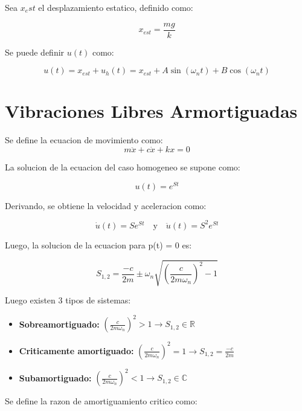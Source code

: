 \documentclass{article}  %
\begin{document}
Sea $x_est$ el desplazamiento estatico, definido como:

\begin{equation}
    x_{est} = \frac{mg}{k}
\end{equation}

Se puede definir $u(t)$ como:

\begin{equation}
    u(t) = x_{est} + u_h(t) = x_{est} + A \sin(\omega_n t) + B \cos(\omega_n t)
\end{equation}

\section{Vibraciones Libres Armortiguadas}

Se define la ecuacion de movimiento como:
\begin{equation}
    m \ddot{x} + c \dot{x} + kx = 0
\end{equation}

La solucion de la ecuacion del caso homogeneo se supone como:

\begin{equation}
    u(t) = e^{St}
\end{equation}

Derivando, se obtiene la velocidad y aceleracion como:

\begin{equation}
    \dot{u}(t) = Se^{St} \quad \text{y} \quad \ddot{u}(t) = S^2 e^{St}
\end{equation}

Luego, la solucion de la ecuacion para p(t) = 0 es:

\begin{equation}
    S_{1,2} =  \frac{-c}{2m} \pm \omega_n \sqrt{(\frac{c}{2m\omega_n})^2 - 1}
\end{equation}

Luego existen 3 tipos de sistemas:
\begin{itemize}
    \item \textbf{Sobreamortiguado:} $(\frac{c}{2m\omega_n})^2 > 1 \rightarrow S_{1,2} \in \mathbb{R}$ 
    \item \textbf{Criticamente amortiguado:} $(\frac{c}{2m\omega_n})^2 = 1  \rightarrow S_{1,2} = \frac{-c}{2m}$
    \item \textbf{Subamortiguado:} $(\frac{c}{2m\omega_n})^2 < 1 \rightarrow S_{1,2} \in \mathbb{C}$
\end{itemize}

Se define la razon de amortiguamiento critico como:
\end{document}
